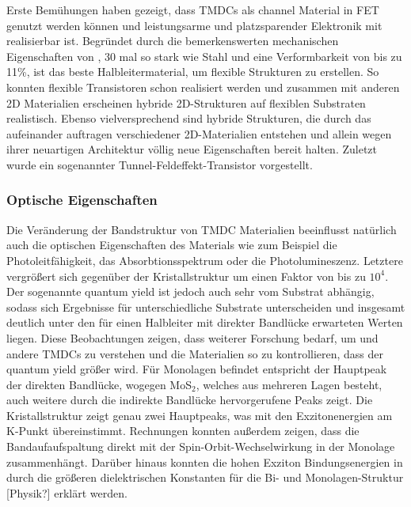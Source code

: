 Erste Bemühungen haben gezeigt, dass TMDCs als channel Material in FET genutzt werden können und leistungsarme und platzsparender Elektronik mit \mos realisierbar ist. Begründet durch die bemerkenswerten mechanischen Eigenschaften von \mos, 30 mal so stark wie Stahl und eine Verformbarkeit von bis zu 11\%, ist \mos das beste Halbleitermaterial, um flexible Strukturen zu erstellen. So konnten flexible Transistoren schon realisiert werden und zusammen mit anderen 2D Materialien erscheinen hybride 2D-Strukturen auf flexiblen Substraten realistisch. Ebenso vielversprechend sind hybride Strukturen, die durch das aufeinander auftragen verschiedener 2D-Materialien entstehen und allein wegen ihrer neuartigen Architektur völlig neue Eigenschaften bereit halten. Zuletzt wurde ein sogenannter Tunnel-Feldeffekt-Transistor vorgestellt.\\

\subsubsection*{Optische Eigenschaften}
Die Veränderung der Bandstruktur von TMDC Materialien beeinflusst natürlich auch die optischen Eigenschaften des Materials wie zum Beispiel die Photoleitfähigkeit, das Absorbtionsspektrum oder die Photolumineszenz. Letztere vergrößert sich gegenüber der Kristallstruktur um einen Faktor von bis zu $10^4$. Der sogenannte quantum yield ist jedoch auch sehr vom Substrat abhängig, sodass sich Ergebnisse für unterschiedliche Substrate unterscheiden und insgesamt deutlich unter den für einen Halbleiter mit direkter Bandlücke erwarteten Werten liegen. Diese Beobachtungen zeigen, dass weiterer Forschung bedarf, um \mos und andere TMDCs zu verstehen und die Materialien so zu kontrollieren, dass der quantum yield größer wird. Für \mos Monolagen befindet entspricht der Hauptpeak der direkten Bandlücke, wogegen MoS$_2$, welches aus mehreren Lagen besteht, auch weitere durch die indirekte Bandlücke hervorgerufene Peaks zeigt. Die Kristallstruktur zeigt genau zwei Hauptpeaks, was mit den Exzitonenergien am K-Punkt übereinstimmt. Rechnungen konnten außerdem zeigen, dass die Bandaufaufspaltung direkt mit der Spin-Orbit-Wechselwirkung in der Monolage zusammenhängt. Darüber hinaus konnten die hohen Exziton Bindungsenergien in durch die größeren dielektrischen Konstanten für die Bi- und Monolagen-Struktur [Physik?] erklärt werden. \\

